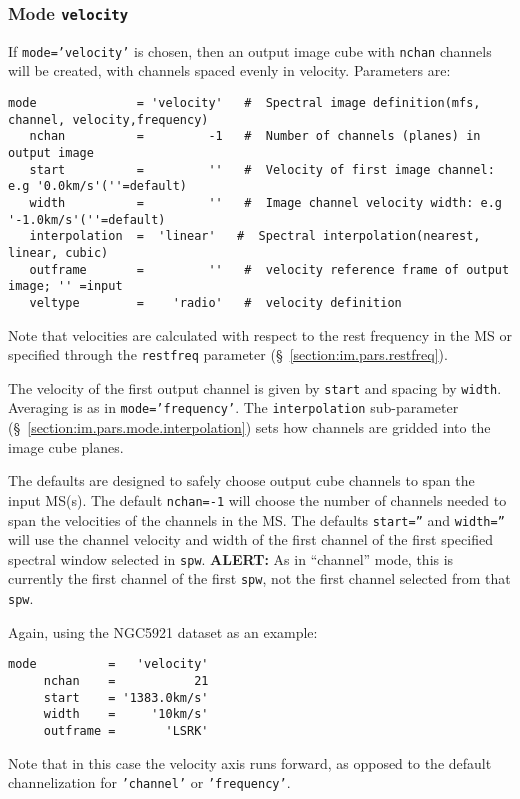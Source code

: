 \subsubsection{Mode {\tt velocity} }
\label{section:im.pars.mode.velocity}

If {\tt mode='velocity'} is chosen, then an output image cube
with {\tt nchan} channels will be created, with channels spaced
evenly in velocity.  Parameters are:
\small
\begin{verbatim}
mode              = 'velocity'   #  Spectral image definition(mfs, channel, velocity,frequency)
   nchan          =         -1   #  Number of channels (planes) in output image
   start          =         ''   #  Velocity of first image channel: e.g '0.0km/s'(''=default)
   width          =         ''   #  Image channel velocity width: e.g '-1.0km/s'(''=default)
   interpolation  =  'linear'   #  Spectral interpolation(nearest, linear, cubic)
   outframe       =         ''   #  velocity reference frame of output image; '' =input
   veltype        =    'radio'   #  velocity definition
\end{verbatim}
\normalsize
Note that velocities are calculated with respect to the rest frequency
in the MS or specified through the {\tt restfreq} parameter
(\S~\ref{section:im.pars.restfreq}).

The velocity of the first output channel is given by {\tt start}
and spacing by {\tt width}.  Averaging is as in
{\tt mode='frequency'}.  The {\tt interpolation} sub-parameter
(\S~\ref{section:im.pars.mode.interpolation}) sets how channels are
gridded into the image cube planes.

The defaults are designed to safely choose output cube channels to
span the input MS(s).
The default {\tt nchan=-1} will choose the number of channels needed
to span the velocities of the channels in the MS.  
The defaults {\tt start=''} and {\tt width=''} will use the channel
velocity and width of the first channel of the first specified
spectral window selected in {\tt spw}.  {\bf ALERT:} As in ``channel''
mode, this is currently the first channel of the first {\tt spw}, not
the first channel selected from that {\tt spw}.  

Again, using the NGC5921 dataset as an example:
\small
\begin{verbatim}
mode          =   'velocity'        
     nchan    =           21        
     start    = '1383.0km/s'      
     width    =     '10km/s'        
     outframe =       'LSRK'
\end{verbatim}
\normalsize
Note that in this case the velocity axis runs forward, as opposed to
the default channelization for {\tt 'channel'} or {\tt 'frequency'}.

